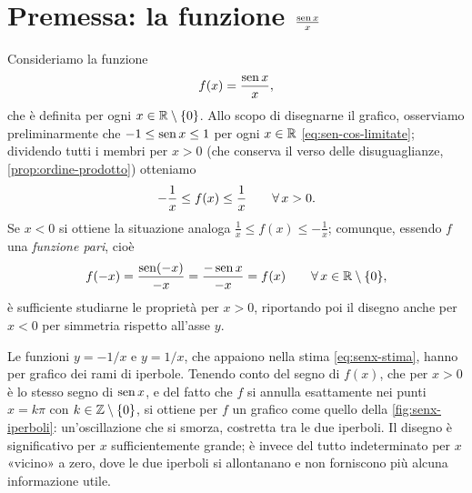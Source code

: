 \section{Premessa: la funzione \texorpdfstring{$\frac{\operatorname{sen} x}{x}$}{sen x / x}}
\label{sec:premessa-funzioni}

Consideriamo la funzione
\begin{equation}\label{eq:senx-x}
  f(x)=\frac{\operatorname{sen} x}{x},
\end{equation}
che è definita per ogni $x\in\mathbb{R}\setminus\{0\}$. Allo scopo di disegnarne il grafico,
osserviamo preliminarmente che $-1\le\operatorname{sen} x\le1$ per ogni $x\in\mathbb{R}$
\eqref{eq:sen-cos-limitate}; dividendo tutti i membri per $x>0$ (che conserva il verso
delle disuguaglianze, \cref{prop:ordine-prodotto}) otteniamo
\begin{equation}\label{eq:senx-stima}
  -\frac1x\le f(x)\le\frac1x \qquad\forall\, x>0 .
\end{equation}
Se $x<0$ si ottiene la situazione analoga $\frac1x\le f(x)\le-\frac1x$; comunque, essendo
$f$ una \emph{funzione pari}, cioè
\[
  f(-x)=\frac{\operatorname{sen}(-x)}{-x}=\frac{-\operatorname{sen} x}{-x}=f(x) \qquad\forall\, x\in\mathbb{R}\setminus\{0\},
\]
è sufficiente studiarne le proprietà per $x>0$, riportando poi il disegno anche per
$x<0$ per simmetria rispetto all'asse $y$.

Le funzioni $y=-1/x$ e $y=1/x$, che appaiono nella stima \eqref{eq:senx-stima}, hanno per
grafico dei rami di iperbole. Tenendo conto del segno di $f(x)$, che per $x>0$ è lo
stesso segno di $\operatorname{sen} x$, e del fatto che $f$ si annulla esattamente nei punti $x=k\pi$
con $k\in\mathbb{Z}\setminus\{0\}$, si ottiene per $f$ un grafico come quello della
\cref{fig:senx-iperboli}: un'oscillazione che si smorza, costretta tra le due iperboli.
Il disegno è significativo per $x$ sufficientemente grande; è invece del tutto
indeterminato per $x$ «vicino» a zero, dove le due iperboli si allontanano e non
forniscono più alcuna informazione utile.

